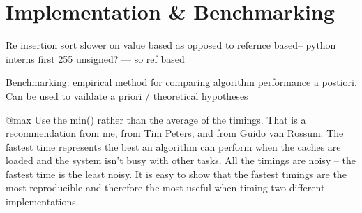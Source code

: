 \documentclass[12pt, a4paper]{article}
\begin{document}
\section{Implementation \& Benchmarking}

Re insertion sort slower on value based as opposed to refernce based-- python interns first 255 unsigned? --- so ref based

Benchmarking: empirical method for comparing algorithm performance a postiori. Can be used to vaildate a priori / theoretical hypotheses

@max Use the min() rather than the average of the timings. That is a recommendation from me, from Tim Peters, and from Guido van Rossum. The fastest time represents the best an algorithm can perform when the caches are loaded and the system isn't busy with other tasks. All the timings are noisy -- the fastest time is the least noisy. It is easy to show that the fastest timings are the most reproducible and therefore the most useful when timing two different implementations.
\end{document}
